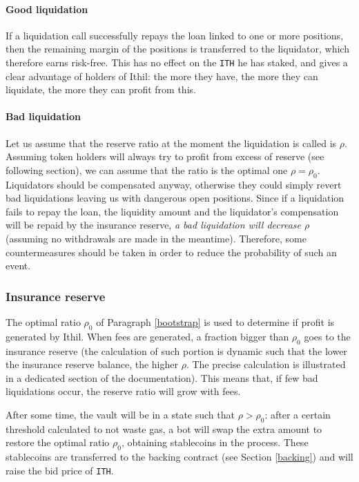 \documentclass[a4paper,10 pt]{article}
\theoremstyle{definition}
\begin{document}
\paragraph{Good liquidation}
If a liquidation call successfully repays the loan linked to one or more positions, then the remaining margin of the positions is transferred to the liquidator, which therefore earns risk-free. This has no effect on the \verb|ITH| he has staked, and gives a clear advantage of holders of Ithil: the more they have, the more they can liquidate, the more they can profit from this.

\paragraph{Bad liquidation}
Let us assume that the reserve ratio at the moment the liquidation is called is $\rho$. Assuming token holders will always try to profit from excess of reserve (see following section), we can assume that the ratio is the optimal one $\rho=\rho_0$.  Liquidators should be compensated anyway, otherwise they could simply revert bad liquidations leaving us with dangerous open positions. Since if a liquidation fails to repay the loan, the liquidity amount and the liquidator's compensation will be repaid by the insurance reserve, {\it a bad liquidation will decrease $\rho$} (assuming no withdrawals are made in the meantime). Therefore, some countermeasures should be taken in order to reduce the probability of such an event.

\subsubsection{Insurance reserve}

The optimal ratio $\rho_0$ of Paragraph \ref{bootstrap} is used to determine if profit is generated by Ithil. When fees are generated, a fraction bigger than $\rho_0$ goes to the insurance reserve (the calculation of such portion is dynamic such that the lower the insurance reserve balance, the higher $\rho$. The precise calculation is illustrated in a dedicated section of the documentation). This means that, if few bad liquidations occur, the reserve ratio will grow with fees.

After some time, the vault will be in a state such that $\rho > \rho_0$: after a certain threshold calculated to not waste gas, a bot will swap the extra amount to restore the optimal ratio $\rho_0$, obtaining stablecoins in the process. These stablecoins are transferred to the backing contract (see Section \ref{backing}) and will raise the bid price of \verb|ITH|.
\end{document}
